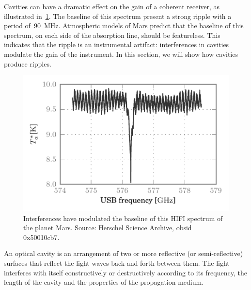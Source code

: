 Cavities can have a dramatic effect on the gain of a coherent receiver, as illustrated in~\cref{fig:mars_50010cb7_WBSH_USB_chp2}.
The baseline of this spectrum present a strong ripple with a period of~\SI{90}{\mega\hertz}.
Atmospheric models of Mars predict that the baseline of this spectrum, on each side of the absorption line, should be featureless.
This indicates that the ripple is an instrumental artifact: interferences in cavities modulate the gain of the instrument.
In this section, we will show how cavities produce ripples.
\begin{figure}
    \centering
    \includegraphics[width=\textwidth]{mars_50010cb7_WBSH_USB}
    \caption{Interferences have modulated the baseline of this HIFI spectrum of the planet Mars.
        Source: Herschel Science Archive, obsid 0x50010cb7.
    }
    \label{fig:mars_50010cb7_WBSH_USB_chp2}
\end{figure}

An optical cavity is an arrangement of two or more reflective (or semi-reflective) surfaces that reflect the light waves back and forth between them.
The light interferes with itself constructively or destructively according to its frequency, the length of the cavity and the properties of the propagation medium.

